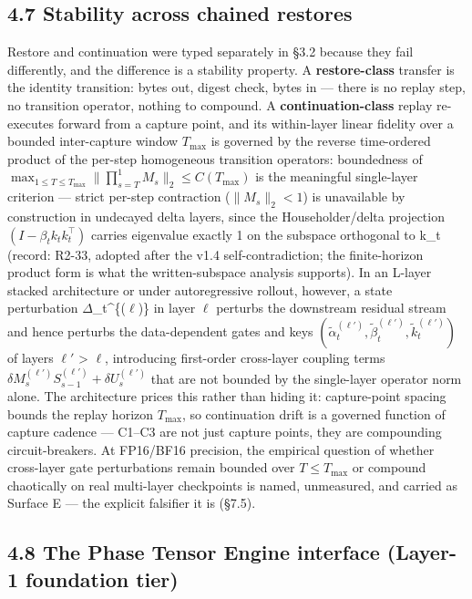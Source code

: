 \documentclass[11pt]{article}
\begin{document}
\subsection{4.7 Stability across chained restores}\label{stability-across-chained-restores}

Restore and continuation were typed separately in \S{}3.2 because they fail differently, and the difference is a stability property. A \textbf{restore-class} transfer is the identity transition: bytes out, digest check, bytes in --- there is no replay step, no transition operator, nothing to compound. A \textbf{continuation-class} replay re-executes forward from a capture point, and its within-layer linear fidelity over a bounded inter-capture window \(T_{\max}\) is governed by the reverse time-ordered product of the per-step homogeneous transition operators: boundedness of \(\max_{1\leq T\leq T_{\max}} \lVert\prod_{s=T}^{1} M_s\rVert_2 \leq C(T_{\max})\) is the meaningful single-layer criterion --- strict per-step contraction (\(\lVert M_s\rVert_2 < 1\)) is unavailable by construction in undecayed delta layers, since the Householder/delta projection \((I - \beta_t k_t k_t^{\top})\) carries eigenvalue exactly 1 on the subspace orthogonal to k\_t (record: R2-33, adopted after the v1.4 self-contradiction; the finite-horizon product form is what the written-subspace analysis supports). In an L-layer stacked architecture or under autoregressive rollout, however, a state perturbation \(\Delta\)\_t\^{}\{(\(\ell\))\} in layer \(\ell\) perturbs the downstream residual stream and hence perturbs the data-dependent gates and keys \((\tilde{\alpha}_t^{(\ell')}, \tilde{\beta}_t^{(\ell')}, \tilde{k}_t^{(\ell')})\) of layers \(\ell'\) \textgreater{} \(\ell\), introducing first-order cross-layer coupling terms \(\delta M_s^{(\ell')} S_{s-1}^{(\ell')} + \delta U_s^{(\ell')}\) that are not bounded by the single-layer operator norm alone. The architecture prices this rather than hiding it: capture-point spacing bounds the replay horizon \(T_{\max}\), so continuation drift is a governed function of capture cadence --- C1--C3 are not just capture points, they are compounding circuit-breakers. At FP16/BF16 precision, the empirical question of whether cross-layer gate perturbations remain bounded over \(T \leq T_{\max}\) or compound chaotically on real multi-layer checkpoints is named, unmeasured, and carried as Surface E --- the explicit falsifier it is (\S{}7.5).

\subsection{4.8 The Phase Tensor Engine interface (Layer-1 foundation tier)}\label{the-phase-tensor-engine-interface-layer-1-foundation-tier}
\end{document}
